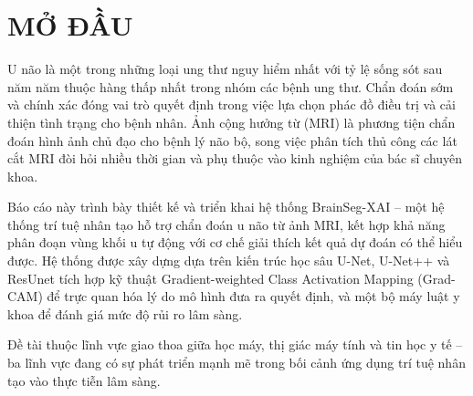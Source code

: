 
\chapter*{MỞ ĐẦU}

\label{Chapter0}


U não là một trong những loại ung thư nguy hiểm nhất với tỷ lệ sống sót sau năm năm thuộc hàng thấp nhất trong nhóm các bệnh ung thư. Chẩn đoán sớm và chính xác đóng vai trò quyết định trong việc lựa chọn phác đồ điều trị và cải thiện tình trạng cho bệnh nhân. Ảnh cộng hưởng từ (MRI) là phương tiện chẩn đoán hình ảnh chủ đạo cho bệnh lý não bộ, song việc phân tích thủ công các lát cắt MRI đòi hỏi nhiều thời gian và phụ thuộc vào kinh nghiệm của bác sĩ chuyên khoa.

Báo cáo này trình bày thiết kế và triển khai hệ thống BrainSeg-XAI -- một hệ thống trí tuệ nhân tạo hỗ trợ chẩn đoán u não từ ảnh MRI, kết hợp khả năng phân đoạn vùng khối u tự động với cơ chế giải thích kết quả dự đoán có thể hiểu được. Hệ thống được xây dựng dựa trên kiến trúc học sâu U-Net, U-Net++ và ResUnet tích hợp kỹ thuật Gradient-weighted Class Activation Mapping (Grad-CAM) để trực quan hóa lý do mô hình đưa ra quyết định, và một bộ máy luật y khoa để đánh giá mức độ rủi ro lâm sàng.

Đề tài thuộc lĩnh vực giao thoa giữa học máy, thị giác máy tính và tin học y tế -- ba lĩnh vực đang có sự phát triển mạnh mẽ trong bối cảnh ứng dụng trí tuệ nhân tạo vào thực tiễn lâm sàng.
